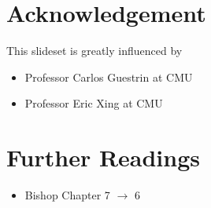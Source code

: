 \documentclass[a4paper]{oblivoir}
\begin{document}
\section*{Acknowledgement}
\noindent This slideset is greatly influenced by
\begin{itemize}\setlength\itemsep{-\parsep}
\item Professor Carlos Guestrin at CMU
\item Professor Eric Xing at CMU
\end{itemize}

\section*{Further Readings}
\begin{itemize}
\setlength\itemsep{-\parsep}
\item Bishop Chapter 7 $\rightarrow$ 6
\end{itemize}
\end{document}
